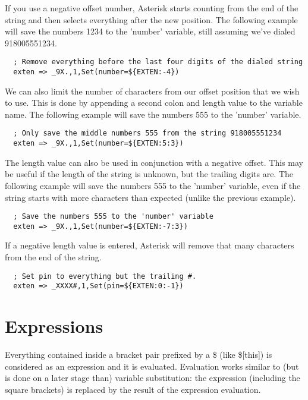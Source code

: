 If you use a negative offset number, Asterisk starts counting from the end
of the string and then selects everything after the new position. The following
example will save the numbers 1234 to the 'number' variable, still assuming
we've dialed 918005551234.
\begin{astlisting}
\begin{verbatim}
  ; Remove everything before the last four digits of the dialed string
  exten => _9X.,1,Set(number=${EXTEN:-4})
\end{verbatim}
\end{astlisting}
We can also limit the number of characters from our offset position that we
wish to use. This is done by appending a second colon and length value to the
variable name. The following example will save the numbers 555 to the 'number'
variable.
\begin{astlisting}
\begin{verbatim}
  ; Only save the middle numbers 555 from the string 918005551234
  exten => _9X.,1,Set(number=${EXTEN:5:3})
\end{verbatim}
\end{astlisting}
The length value can also be used in conjunction with a negative offset. This
may be useful if the length of the string is unknown, but the trailing digits
are. The following example will save the numbers 555 to the 'number' variable,
even if the string starts with more characters than expected (unlike the
previous example).
\begin{astlisting}
\begin{verbatim}
  ; Save the numbers 555 to the 'number' variable
  exten => _9X.,1,Set(number=${EXTEN:-7:3})
\end{verbatim}
\end{astlisting}
If a negative length value is entered, Asterisk will remove that many characters
from the end of the string.
\begin{astlisting}
\begin{verbatim}
  ; Set pin to everything but the trailing #.
  exten => _XXXX#,1,Set(pin=${EXTEN:0:-1})
\end{verbatim}
\end{astlisting}

\section{Expressions}

Everything contained inside a bracket pair prefixed by a \$ (like \$[this]) is
considered as an expression and it is evaluated. Evaluation works similar to
(but is done on a later stage than) variable substitution: the expression
(including the square brackets) is replaced by the result of the expression
evaluation.

